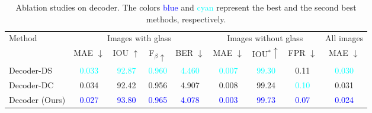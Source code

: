 \begin{table*}[ht]
\renewcommand\arraystretch{1.5}
\setlength\tabcolsep{5pt}
\centering
\caption{Ablation studies on decoder. The colors \textcolor{blue}{blue} and \textcolor{cyan}{cyan} represent the best and the second best methods, respectively.} 
\label{tab:ab_decoder}
\begin{tabular}{lcccccccc} 
\toprule
\multirow{2}{*}{Method} & \multicolumn{4}{c}{Images with glass} & \multicolumn{3}{c}{Images without glass} & All images        \\ 
\cmidrule[0.25pt](lr){2-5} \cmidrule[0.25pt](lr){6-8} \cmidrule[0.25pt](lr){9-9} 
& MAE $\downarrow$                      & IOU $\uparrow$                        & F$_\beta\uparrow$                     & BER $\downarrow$                      & MAE $\downarrow$                      & IOU$^\ast\uparrow$                    & FPR $\downarrow$                     & MAE $\downarrow$  \\ 
\midrule

Decoder-DS & \multicolumn{1}{c}{\textcolor{cyan}{0.033}} & \multicolumn{1}{c}{\textcolor{cyan}{92.87}} & \multicolumn{1}{c}{\textcolor{cyan}{0.960}} & \textcolor{cyan}{4.460} & \multicolumn{1}{c}{\textcolor{cyan}{0.007}} & \multicolumn{1}{c}{\textcolor{cyan}{99.30}} & 0.11 & \textcolor{cyan}{0.030}\\ 
Decoder-DC & \multicolumn{1}{c}{0.034} & \multicolumn{1}{c}{92.42} & \multicolumn{1}{c}{0.956} & 4.907 & \multicolumn{1}{c}{0.008} & \multicolumn{1}{c}{99.24} & \textcolor{cyan}{0.10} & 0.031\\ \hline

Decoder (Ours) & \multicolumn{1}{c}{\textcolor{blue}{0.027}} & \multicolumn{1}{c}{\textcolor{blue}{93.80}} & \multicolumn{1}{c}{\textcolor{blue}{0.965}} & \textcolor{blue}{4.078} & \multicolumn{1}{c}{\textcolor{blue}{0.003}} & \multicolumn{1}{c}{\textcolor{blue}{99.73}} & \textcolor{blue}{0.07} &\textcolor{blue}{0.024}\\ 
\bottomrule
\end{tabular}
\end{table*}



